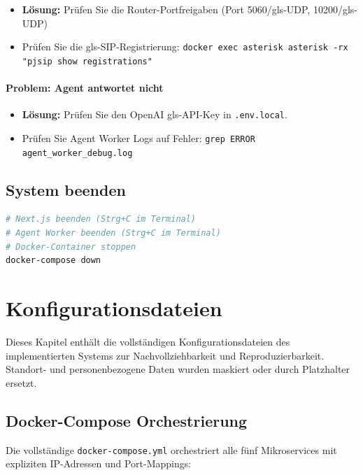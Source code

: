 \begin{itemize}
\item \textbf{Lösung:} Prüfen Sie die Router-Portfreigaben (Port 5060/\gls{gls-UDP}, 10200/\gls{gls-UDP})
  \item Prüfen Sie die \gls{gls-SIP}-Registrierung: \texttt{docker exec asterisk asterisk -rx "pjsip show registrations"}
\end{itemize}

\subsubsection{Problem: Agent antwortet nicht}

\begin{itemize}
  \item \textbf{Lösung:} Prüfen Sie den OpenAI \gls{gls-API}-Key in \texttt{.env.local}.
  \item Prüfen Sie Agent Worker Logs auf Fehler: \texttt{grep ERROR agent\_worker\_debug.log}
\end{itemize}

\section{System beenden}
\label{sec:anhang-shutdown}

\begin{lstlisting}[language=bash,caption={Alle Komponenten beenden}]
# Next.js beenden (Strg+C im Terminal)
# Agent Worker beenden (Strg+C im Terminal)
# Docker-Container stoppen
docker-compose down
\end{lstlisting}

\chapter{Konfigurationsdateien}
\label{ch:anhang-config}

Dieses Kapitel enthält die vollständigen Konfigurationsdateien des implementierten Systems zur Nachvollziehbarkeit und Reproduzierbarkeit. Standort- und personenbezogene Daten wurden maskiert oder durch Platzhalter ersetzt.

\section{Docker-Compose Orchestrierung}
\label{sec:anhang-docker-compose}

Die vollständige \texttt{docker-compose.yml} orchestriert alle fünf Mikroservices mit expliziten IP-Adressen und Port-Mappings:

